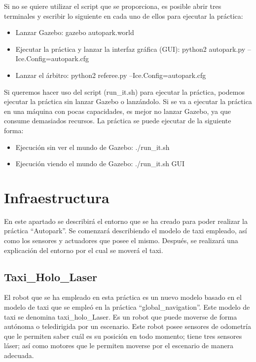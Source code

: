 Si no se quiere utilizar el script que se proporciona, es posible abrir tres terminales y escribir lo siguiente en cada uno de ellos para ejecutar la práctica:

\begin{itemize}
\item Lanzar Gazebo: gazebo autopark.world
\item Ejecutar la práctica y lanzar la interfaz gráfica (GUI): python2 autopark.py --Ice.Config=autopark.cfg
\item Lanzar el árbitro: python2 referee.py --Ice.Config=autopark.cfg
\end{itemize}

Si queremos hacer uso del script (run\_it.sh) para ejecutar la práctica, podemos ejecutar la práctica sin lanzar Gazebo o lanzándolo. Si se va a ejecutar la práctica en una máquina con pocas capacidades, es mejor no lanzar Gazebo, ya que consume demasiados recursos. La práctica se puede ejecutar de la siguiente forma:

\begin{itemize}
\item Ejecución sin ver el mundo de Gazebo: ./run\_it.sh
\item Ejecución viendo el mundo de Gazebo: ./run\_it.sh GUI
\end{itemize}

\section{Infraestructura}
En este apartado se describirá el entorno que se ha creado para poder realizar la práctica ``Autopark''. Se comenzará describiendo el modelo de taxi empleado, así como los sensores y actuadores que posee el mismo. Después, se realizará una explicación del entorno por el cual se moverá el taxi.\\

\subsection{Taxi\_Holo\_Laser}
El robot que se ha empleado en esta práctica es un nuevo modelo basado en el modelo de taxi que se empleó en la práctica ``global\_navigation''. Este modelo de taxi se denomina taxi\_holo\_Laser. Es un robot que puede moverse de forma autónoma o teledirigida por un escenario. Este robot posee sensores de odometría que le permiten saber cuál es su posición en todo momento; tiene tres sensores láser; así como motores que le permiten moverse por el escenario de manera adecuada.\\


